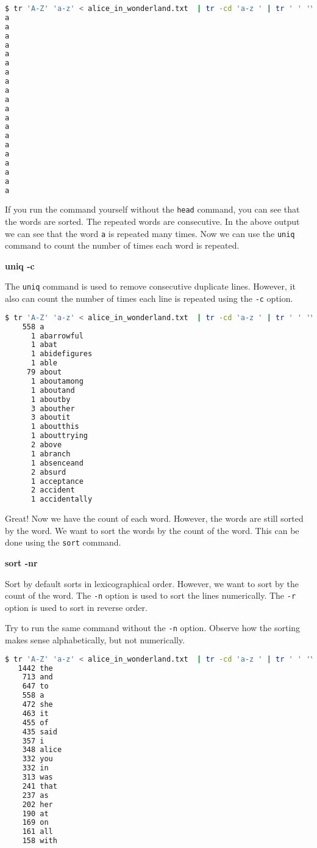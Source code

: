\begin{lstlisting}[language=bash]
$ tr 'A-Z' 'a-z' < alice_in_wonderland.txt  | tr -cd 'a-z ' | tr ' ' '\n' | grep . | sort | head -20
a
a
a
a
a
a
a
a
a
a
a
a
a
a
a
a
a
a
a
a
\end{lstlisting}

If you run the command yourself without the \texttt{head} command, you
can see that the words are sorted. The repeated words are consecutive.
In the above output we can see that the word \texttt{a} is repeated
many times. Now we can use the \texttt{uniq} command to count the
number of times each word is repeated.

\textbf{uniq -c}

The \texttt{uniq} command is used to remove consecutive duplicate lines.
However, it also can count the number of times each line is repeated
using the \texttt{-c} option.

\begin{lstlisting}[language=bash]
$ tr 'A-Z' 'a-z' < alice_in_wonderland.txt  | tr -cd 'a-z ' | tr ' ' '\n' | grep . | sort | uniq -c | head -20
    558 a
      1 abarrowful
      1 abat
      1 abidefigures
      1 able
     79 about
      1 aboutamong
      1 aboutand
      1 aboutby
      3 abouther
      3 aboutit
      1 aboutthis
      1 abouttrying
      2 above
      1 abranch
      1 absenceand
      2 absurd
      1 acceptance
      2 accident
      1 accidentally
\end{lstlisting}

Great! Now we have the count of each word. However, the words are
still sorted by the word. We want to sort the words by the count
of the word. This can be done using the \texttt{sort} command.

\textbf{sort -nr}

Sort by default sorts in lexicographical order. However, we want to
sort by the count of the word. The \texttt{-n} option is used to sort
the lines numerically. The \texttt{-r} option is used to sort in
reverse order.

\begin{exercise}
  Try to run the same command without the \texttt{-n} option.
  Observe how the sorting makes sense alphabetically, but not
  numerically.
\end{exercise}

\begin{lstlisting}[language=bash]
$ tr 'A-Z' 'a-z' < alice_in_wonderland.txt  | tr -cd 'a-z ' | tr ' ' '\n' | grep . | sort | uniq -c | sort -nr | head -20
   1442 the
    713 and
    647 to
    558 a
    472 she
    463 it
    455 of
    435 said
    357 i
    348 alice
    332 you
    332 in
    313 was
    241 that
    237 as
    202 her
    190 at
    169 on
    161 all
    158 with
\end{lstlisting}

